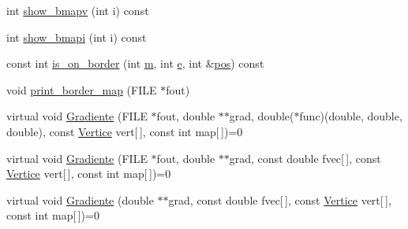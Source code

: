 \begin{DoxyCompactItemize}
int \hyperlink{classStdel_ac8787dabfb1d767b89e39806522c1161}{show\+\_\+bmapv} (int i) const
\item 
int \hyperlink{classStdel_ad3a0646ad7ec2567e46da36285dee331}{show\+\_\+bmapi} (int i) const
\item 
const int \hyperlink{classStdel_abb022f0ad81707e11e3a3091d2d87c46}{is\+\_\+on\+\_\+border} (int \hyperlink{DG__EI__Header_8h_a742204794ea328ba293fe59cec79b990}{m}, int \hyperlink{DG__EI__Header_8h_ab1ff01ebd410ddf016a3c7bbe9d98944}{e}, int \&\hyperlink{DG__EI__Header_8h_a1910d262855b71da353ed0d07a6c7823}{pos}) const
\item 
void \hyperlink{classStdel_a9a0c69dca7564f6ca4aa4f3c9864ea01}{print\+\_\+border\+\_\+map} (F\+I\+LE $\ast$fout)
\item 
virtual void \hyperlink{classStdel_af3e65d1ad0d59ded925a3f5a9d0fb100}{Gradiente} (F\+I\+LE $\ast$fout, double $\ast$$\ast$grad, double($\ast$func)(double, double, double), const \hyperlink{structVertice}{Vertice} vert\mbox{[}$\,$\mbox{]}, const int map\mbox{[}$\,$\mbox{]})=0
\item 
virtual void \hyperlink{classStdel_abf44e457d99e8c559c14cb1f7423da12}{Gradiente} (F\+I\+LE $\ast$fout, double $\ast$$\ast$grad, const double fvec\mbox{[}$\,$\mbox{]}, const \hyperlink{structVertice}{Vertice} vert\mbox{[}$\,$\mbox{]}, const int map\mbox{[}$\,$\mbox{]})=0
\item 
virtual void \hyperlink{classStdel_aec200dfb0b00bebf70a1d845675eeafd}{Gradiente} (double $\ast$$\ast$grad, const double fvec\mbox{[}$\,$\mbox{]}, const \hyperlink{structVertice}{Vertice} vert\mbox{[}$\,$\mbox{]}, const int map\mbox{[}$\,$\mbox{]})=0
\end{DoxyCompactItemize}
